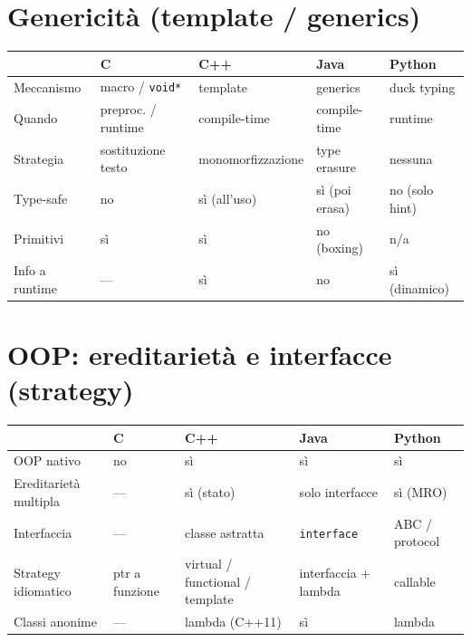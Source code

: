 \documentclass{report}
\newcommand{\code}[1]{\texttt{\small #1}}
\begin{document}
\section{Genericità (template / generics)}

\begin{center}
\renewcommand{\arraystretch}{1.35}
\footnotesize
\begin{tabular}{|>{\raggedright\arraybackslash}p{3.2cm}|>{\raggedright\arraybackslash}p{2.3cm}|>{\raggedright\arraybackslash}p{2.7cm}|>{\raggedright\arraybackslash}p{2.5cm}|>{\raggedright\arraybackslash}p{2.4cm}|}
\hline
 & \textbf{C} & \textbf{C++} & \textbf{Java} & \textbf{Python} \\
\hline
Meccanismo & macro / \code{void*} & template & generics & duck typing \\
\hline
Quando & preproc. / runtime & compile-time & compile-time & runtime \\
\hline
Strategia & sostituzione testo & monomorfizzazione & type erasure & nessuna \\
\hline
Type-safe & no & sì (all'uso) & sì (poi erasa) & no (solo hint) \\
\hline
Primitivi & sì & sì & no (boxing) & n/a \\
\hline
Info a runtime & --- & sì & no & sì (dinamico) \\
\hline
\end{tabular}
\end{center}

\section{OOP: ereditarietà e interfacce (strategy)}

\begin{center}
\renewcommand{\arraystretch}{1.35}
\footnotesize
\begin{tabular}{|>{\raggedright\arraybackslash}p{3.2cm}|>{\raggedright\arraybackslash}p{2.2cm}|>{\raggedright\arraybackslash}p{2.7cm}|>{\raggedright\arraybackslash}p{2.6cm}|>{\raggedright\arraybackslash}p{2.4cm}|}
\hline
 & \textbf{C} & \textbf{C++} & \textbf{Java} & \textbf{Python} \\
\hline
OOP nativo & no & sì & sì & sì \\
\hline
Ereditarietà multipla & --- & sì (stato) & solo interfacce & sì (MRO) \\
\hline
Interfaccia & --- & classe astratta & \code{interface} & ABC / protocol \\
\hline
Strategy idiomatico & ptr a funzione & virtual / functional / template & interfaccia + lambda & callable \\
\hline
Classi anonime & --- & lambda (C++11) & sì & lambda \\
\hline
\end{tabular}
\end{center}
\end{document}
